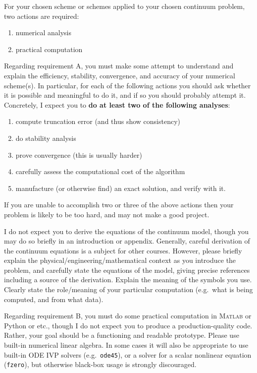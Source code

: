 \documentclass[11pt]{amsart}
\newcommand{\Matlab}{\textsc{Matlab}\xspace}
\begin{document}
For your chosen scheme or schemes applied to your chosen continuum problem, two actions are required:
\renewcommand{\labelenumi}{\Alph{enumi}.}
\begin{enumerate}
\item numerical analysis
\item practical computation
\end{enumerate}

Regarding requirement A, you must make some attempt to understand and explain the efficiency, stability, convergence, and accuracy of your numerical scheme(s).  In particular, for each of the following actions you should ask whether it is possible and meaningful to do it, and if so you should probably attempt it.  Concretely, I expect you to \textbf{do at least two of the following analyses}:
\renewcommand{\labelenumi}{\roman{enumi}.}
\begin{enumerate}
\item compute truncation error (and thus show consistency)
\item do stability analysis
\item prove convergence (this is usually harder)
\item carefully assess the computational cost of the algorithm
\item manufacture (or otherwise find) an exact solution, and verify with it.
\end{enumerate}
If you are unable to accomplish two or three of the above actions then your problem is likely to be too hard, and may not make a good project.

I do not expect you to derive the equations of the continuum model, though you may do so briefly in an introduction or appendix.  Generally, careful derivation of the continuum equations is a subject for other courses.  However, please briefly explain the physical/engineering/mathematical context as you introduce the problem, and carefully state the equations of the model, giving precise references including a source of the derivation.  Explain the meaning of the symbols you use.  Clearly state the role/meaning of your particular computation (e.g.~what is being computed, and from what data).

Regarding requirement B, you must do some practical computation in \Matlab or Python or etc., though I do not expect you to produce a production-quality code.  Rather, your goal should be a functioning and readable prototype.  Please use built-in numerical linear algebra.  In some cases it will also be appropriate to use built-in ODE IVP solvers (e.g.~\texttt{ode45}), or a solver for a scalar nonlinear equation (\texttt{fzero}), but otherwise black-box usage is strongly discouraged.
\end{document}

